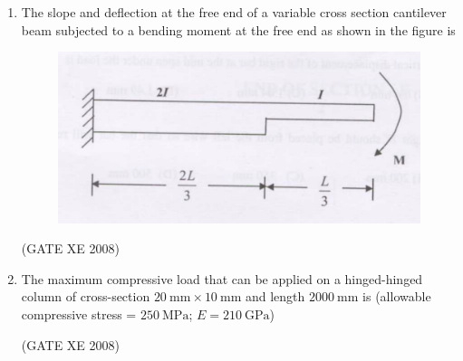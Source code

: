 \documentclass[12pt]{article}
\begin{document}
\begin{enumerate}
    (GATE XE 2008)  
    
    \item The slope and deflection at the free end of a variable cross section cantilever beam subjected to a bending moment at the free end as shown in the figure is  

    \begin{figure}[H]
    \centering
    \includegraphics[width=0.5\columnwidth]{figs/ass1_d_q26.png}
    \caption{}
    \end{figure}

\begin{enumerate}
\end{enumerate}
    
    (GATE XE 2008)  
    
    \item The maximum compressive load that can be applied on a hinged-hinged column of cross-section $20\ \mathrm{mm} \times 10\ \mathrm{mm}$ and length $2000\ \mathrm{mm}$ is (allowable compressive stress = $250\ \mathrm{MPa}$; $E = 210\ \mathrm{GPa}$)  

\begin{enumerate}
\end{enumerate}
    
    (GATE XE 2008)  
    

\end{enumerate}
\end{document}
